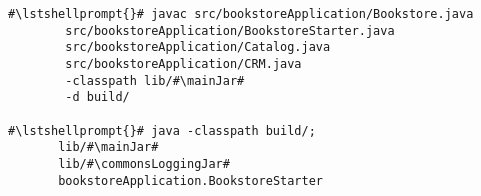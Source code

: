 \begin{lstlisting}[caption=Commands to compile and run the instrumented Bookstore under Windows,label=lst:bookstoreStarterWin]
#\lstshellprompt{}# javac src/bookstoreApplication/Bookstore.java 
        src/bookstoreApplication/BookstoreStarter.java 
        src/bookstoreApplication/Catalog.java 
        src/bookstoreApplication/CRM.java 
        -classpath lib/#\mainJar#
        -d build/

#\lstshellprompt{}# java -classpath build/;
       lib/#\mainJar#
       lib/#\commonsLoggingJar#
       bookstoreApplication.BookstoreStarter 
\end{lstlisting}

